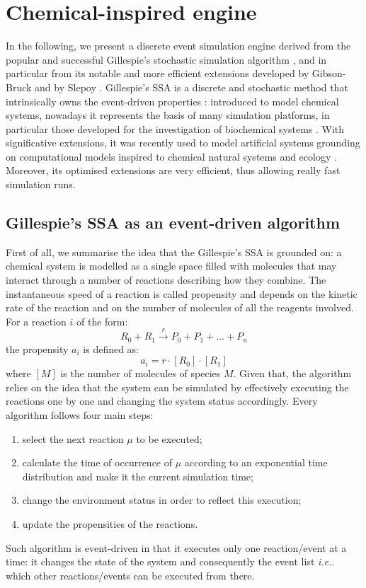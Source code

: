 \documentclass[12pt,a4paper,twoside,openright]{book}
\begin{document}
\section{Chemical-inspired engine}
\label{chemical-engine}
In the following, we present a discrete event simulation engine derived from the popular and successful Gillespie's stochastic simulation algorithm \cite{gillespie1977}, and in particular from its notable and more efficient extensions developed by Gibson-Bruck \cite{gibson2000} and by Slepoy \cite{slepoy2008}.   
%
Gillespie's SSA is a discrete and stochastic method that intrinsically owns the event-driven properties \cite{spatialeventgillespie}: introduced to model chemical systems, nowadays it represents the basis of many simulation platforms, in particular those developed for the investigation of biochemical systems \cite{Priami:2001,Kierzek01032002,CiocchettaH09,versari08,montagna-cs2bio10,btssoc-jos7,Hoops15122006}. 
%
With significative extensions, it was recently used to model artificial systems grounding on computational models inspired to chemical natural systems and ecology \cite{Montagna-MONET2012}.
%
Moreover, its optimised extensions \cite{gibson2000,slepoy2008} are very efficient, thus allowing really fast simulation runs.

\subsection{Gillespie's SSA as an event-driven algorithm}
First of all, we summarise the idea that the Gillespie's SSA is grounded on:
%
a chemical system is modelled as a single space filled with molecules that may interact through a number of reactions describing how they combine. 
%
The instantaneous speed of a reaction is called propensity and depends on the kinetic  rate of the reaction and on the number of molecules of all the reagents involved. 
%
For a reaction $i$ of the form:
$$ R_0 + R_1 \xrightarrow{r} P_0 + P_1 + \ldots + P_n$$
the propensity $a_i$ is defined as:
$$ a_i = r\cdot [R_0] \cdot [R_1] $$
where $[M]$ is the number of molecules of species $M$.
%
Given that, the algorithm relies on the idea that the system can be simulated by effectively executing the reactions one by one and changing the system status accordingly. 
%
Every algorithm follows four main steps:
%
\begin{enumerate}
	\item select the next reaction $\mu$ to be executed;
	\item calculate the time of occurrence of $\mu$ according to an exponential time distribution and make it the current simulation time;
	\item change the environment status in order to reflect this execution;
	\item update the propensities of the reactions.
\end{enumerate}
%
Such algorithm is event-driven in that it executes only one reaction/event at a time: it changes the state of the system and consequently the event list \emph{i.e.}. which other reactions/events can be executed from there.
\end{document}
